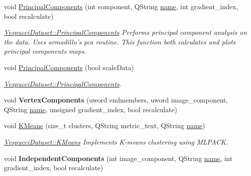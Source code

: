 \begin{DoxyCompactItemize}
void \hyperlink{class_vespucci_dataset_ab4c52da3f8281aa7c7cec96f12f20fca}{Principal\+Components} (int component, Q\+String \hyperlink{class_vespucci_dataset_ae5b30cb466acfdf741b360bc4f897cc9}{name}, int gradient\+\_\+index, bool recalculate)
\begin{DoxyCompactList}\small\item\em \hyperlink{class_vespucci_dataset_ab4c52da3f8281aa7c7cec96f12f20fca}{Vespucci\+Dataset\+::\+Principal\+Components} Performs principal component analysis on the data. Uses armadillo's pca routine. This function both calculates and plots principal components maps. \end{DoxyCompactList}\item 
void \hyperlink{class_vespucci_dataset_a7d9bf2dacd931192a7339785b2d38c7d}{Principal\+Components} (bool scale\+Data)
\begin{DoxyCompactList}\small\item\em \hyperlink{class_vespucci_dataset_ab4c52da3f8281aa7c7cec96f12f20fca}{Vespucci\+Dataset\+::\+Principal\+Components}. \end{DoxyCompactList}\item 
\hypertarget{class_vespucci_dataset_a40501c7de54e334e44594887f4144a96}{void {\bfseries Vertex\+Components} (uword endmembers, uword image\+\_\+component, Q\+String \hyperlink{class_vespucci_dataset_ae5b30cb466acfdf741b360bc4f897cc9}{name}, unsigned gradient\+\_\+index, bool recalculate)}\label{class_vespucci_dataset_a40501c7de54e334e44594887f4144a96}

\item 
void \hyperlink{class_vespucci_dataset_a66187dec3aeafb655e75d7be5af7f52d}{K\+Means} (size\+\_\+t clusters, Q\+String metric\+\_\+text, Q\+String \hyperlink{class_vespucci_dataset_ae5b30cb466acfdf741b360bc4f897cc9}{name})
\begin{DoxyCompactList}\small\item\em \hyperlink{class_vespucci_dataset_a66187dec3aeafb655e75d7be5af7f52d}{Vespucci\+Dataset\+::\+K\+Means} Implements K-\/means clustering using M\+L\+P\+A\+C\+K. \end{DoxyCompactList}\item 
\hypertarget{class_vespucci_dataset_a06e4c491164d6ef3d74f5c5554bd35a5}{void {\bfseries Independent\+Components} (int image\+\_\+component, Q\+String \hyperlink{class_vespucci_dataset_ae5b30cb466acfdf741b360bc4f897cc9}{name}, int gradient\+\_\+index, bool recalculate)}\label{class_vespucci_dataset_a06e4c491164d6ef3d74f5c5554bd35a5}


\end{DoxyCompactItemize}

